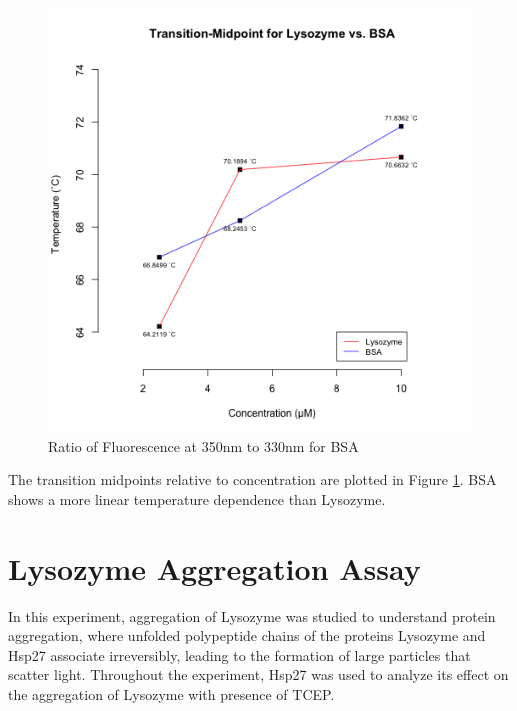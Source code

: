 \documentclass[a4paper,11pt]{article}
\begin{document}
            \begin{minipage}{0.5\textwidth}
                \begin{figure}[H]
                    \centering
                    \includegraphics[width=\textwidth]{../resources/unfolding_tempVconc.png}
                    \caption{Ratio of Fluorescence at 350nm to 330nm for BSA}
                    \label{fig:temp_v_mid}
                \end{figure}
            \end{minipage}
            \begin{minipage}{0.45\textwidth}
                \vspace{-15em}
                The transition midpoints relative to concentration are plotted in Figure \ref{fig:temp_v_mid}.
                BSA shows a more linear temperature dependence than Lysozyme. 
            \end{minipage}
    \pagebreak
    
    \section{Lysozyme Aggregation Assay}
        In this experiment, aggregation of Lysozyme was studied to understand protein aggregation, 
        where unfolded polypeptide chains of the proteins Lysozyme and Hsp27 associate irreversibly, 
        leading to the formation of large particles that scatter light. 
        Throughout the experiment, Hsp27 was used to analyze its effect on the aggregation of 
        Lysozyme with presence of TCEP.
        
\end{document}

